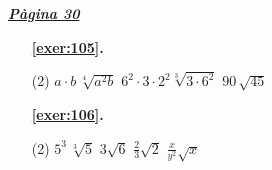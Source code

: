 
\hyperlink{page.30}{\textbf{\em Pàgina 30}}
\begin{enumerate}



 \item[\fontfamily{phv}\selectfont\color{blue}\textbf{\ref{exer:105}. }] \label{ans:105}
 \begin{tasks}[column-sep=1em, item-indent=1.3333em](2)
	 \task $a\cdot b\,\sqrt [4]{a^2 b}$
	 \task* $6^2 \cdot 3 \cdot 2^2 \sqrt [3]{3\cdot 6^2}$
	 \task $90\,\sqrt {45}$
\end{tasks}
 \end{enumerate}
\begin{enumerate}



 \item[\fontfamily{phv}\selectfont\color{blue}\textbf{\ref{exer:106}. }] \label{ans:106}
 \begin{tasks}[column-sep=1em, item-indent=1.3333em](2)
	 \task $5^3\,\sqrt [{3}]{5}$
	 \task $3\sqrt {6}$
	 \task $\frac {2}{3}\sqrt {2}$
	 \task $\frac {x}{y^2}\sqrt {x }$
\end{tasks}
 \end{enumerate}
\vspace{0.3cm}



